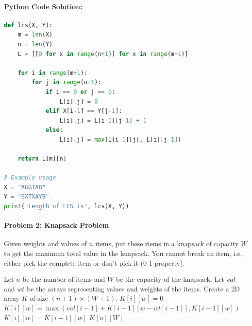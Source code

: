 \documentclass[12pt]{book} %
\begin{document}
\paragraph{Python Code Solution:}
\FloatBarrier
\begin{lstlisting}[language=Python, caption=Longest Common Subsequence]
def lcs(X, Y):
    m = len(X)
    n = len(Y)
    L = [[0 for x in range(n+1)] for x in range(m+1)]

    for i in range(m+1):
        for j in range(n+1):
            if i == 0 or j == 0:
                L[i][j] = 0
            elif X[i-1] == Y[j-1]:
                L[i][j] = L[i-1][j-1] + 1
            else:
                L[i][j] = max(L[i-1][j], L[i][j-1])

    return L[m][n]

# Example usage
X = "AGGTAB"
Y = "GXTXAYB"
print("Length of LCS is", lcs(X, Y))
\end{lstlisting}
\FloatBarrier

\paragraph{Problem 2: Knapsack Problem}
Given weights and values of $n$ items, put these items in a knapsack of capacity $W$ to get the maximum total value in the knapsack. You cannot break an item, i.e., either pick the complete item or don’t pick it (0-1 property).

\begin{algorithm}
\caption{0-1 Knapsack Problem}
\begin{algorithmic}[1]
\State Let $n$ be the number of items and $W$ be the capacity of the knapsack.
\State Let $val$ and $wt$ be the arrays representing values and weights of the items.
\State Create a 2D array $K$ of size $(n+1) \times (W+1)$.
            \State $K[i][w] = 0$
            \State $K[i][w] = \max(val[i-1] + K[i-1][w-wt[i-1]], K[i-1][w])$
        \Else
            \State $K[i][w] = K[i-1][w]$
        \EndIf
    \EndFor
\EndFor
\Return $K[n][W]$
\end{algorithmic}
\end{algorithm}
\end{document}
